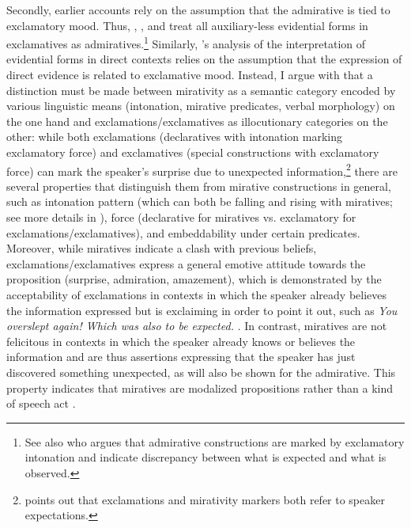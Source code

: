 \documentclass[output=paper]{langscibook}
\begin{document}
Secondly, earlier accounts rely on the assumption that the admirative is tied to exclamatory mood. Thus, \citet{Aleksova2003}, \citet{Simeonova2015}, and \citet{Sonnenhauser2015} treat all auxiliary-less evidential forms in exclamatives as admiratives.\footnote{See also \citet{Guentcheva2017} who argues that admirative constructions are marked by exclamatory intonation and indicate discrepancy between what is expected and what is observed.} Similarly, \citeauthor{Smirnova2013}'s analysis of the interpretation of evidential forms in direct contexts relies on the assumption that the expression of direct evidence is related to exclamative mood. Instead, I argue with \citet{Bustamante2013} that a distinction must be made between mirativity as a semantic category encoded by various linguistic means (intonation, mirative predicates, verbal morphology) on the one hand and exclamations/exclamatives as illocutionary categories on the other: while both exclamations (declaratives with intonation marking exclamatory force) and exclamatives (special constructions with exclamatory force) can mark the speaker's surprise due to unexpected information,\footnote{\citet{Rett2011} points out that exclamations and mirativity markers both refer to speaker expectations.} there are several properties that distinguish them from mirative constructions in general, such as intonation pattern (which can both be falling and rising with miratives; see more details in \citealt[152--153]{Bustamante2013}), force (declarative for miratives vs. exclamatory for exclamations/exclamatives), and embeddability under certain predicates. Moreover, while miratives indicate a clash with previous beliefs, %
exclamations/exclamatives express a general emotive attitude towards the proposition (surprise, admiration, amazement), which is demonstrated by the acceptability of exclamations in contexts in which the speaker already believes the information expressed but is exclaiming in order to point it out, such as \textit{You overslept again! Which was also to be expected.} \citep[149, 154--155]{Bustamante2013}. In contrast, miratives are not felicitous in contexts in which the speaker already knows or believes the information and are thus
assertions expressing that the speaker has just discovered something unexpected, as will also be shown for the  admirative. This property indicates that miratives are modalized propositions rather than a kind of speech act \citep[159]{Bustamante2013}.
\end{document}
